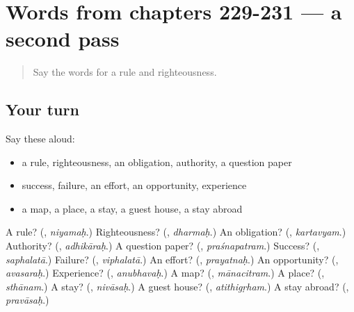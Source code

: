 \section[(dialogue)]{Words from chapters 229-231 — a second pass}

\label{lesson:SA-R231-second-pass-words-from-chapters-229-231}



\begin{quote}
Say the words for a rule and righteousness.
\end{quote}

\subsection*{Your turn}
Say these aloud:

\begin{itemize}
\raggedright
  \item a rule, righteousness, an obligation, authority, a question paper
  \item success, failure, an effort, an opportunity, experience
  \item a map, a place, a stay, a guest house, a stay abroad
\end{itemize}

\begin{tcolorbox}[breakable,colback=teal!4,colframe=teal!35!black,title={Before you move on}]
A rule? (\textbf{}, \emph{niyamaḥ}.) Righteousness? (\textbf{}, \emph{dharmaḥ}.) An obligation? (\textbf{}, \emph{kartavyam}.) Authority? (\textbf{}, \emph{adhikāraḥ}.) A question paper? (\textbf{}, \emph{praśnapatram}.) Success? (\textbf{}, \emph{saphalatā}.) Failure? (\textbf{}, \emph{viphalatā}.) An effort? (\textbf{}, \emph{prayatnaḥ}.) An opportunity? (\textbf{}, \emph{avasaraḥ}.) Experience? (\textbf{}, \emph{anubhavaḥ}.) A map? (\textbf{}, \emph{mānacitram}.) A place? (\textbf{}, \emph{sthānam}.) A stay? (\textbf{}, \emph{nivāsaḥ}.) A guest house? (\textbf{}, \emph{atithigṛham}.) A stay abroad? (\textbf{}, \emph{pravāsaḥ}.)
\end{tcolorbox}
